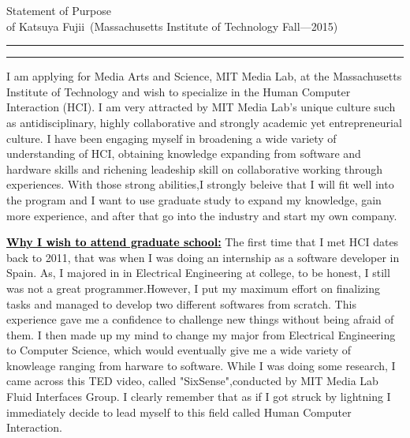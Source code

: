 \documentclass{article}
\newcommand{\soptitle}{Statement of Purpose}
\newcommand{\yourname}{Katsuya Fujii}
\newcommand{\statement}[1]{\par\medskip
  \underline{\textcolor{black}{\textbf{#1:}}}\space
}
\begin{document}
\begin{center}\LARGE\soptitle\\
\large of \yourname\ (Massachusetts Institute of Technology Fall---2015)
\end{center}

\hrule
\vspace{1pt}
\hrule height 1pt

\bigskip


I am applying for Media Arts and Science, MIT Media Lab, at the Massachusetts Institute of Technology and wish to specialize in the Human Computer Interaction (HCI). I am very attracted by MIT Media Lab's unique culture such as antidisciplinary, highly collaborative and strongly academic yet entrepreneurial culture. I have been engaging myself in broadening a wide variety of understanding of HCI, obtaining knowledge expanding from software and hardware skills and richening leadeship skill on collaborative working through experiences. With those strong abilities,I strongly beleive that I will fit well into the program and I want to use graduate study to expand my knowledge, gain more experience, and after that go into the industry and start my own company.


\statement{Why I wish to attend graduate school} The first time that I met HCI dates back to 2011, that was when I was doing an internship as a software developer in Spain. As, I majored in in Electrical Engineering at college, to be honest, I still was not a great programmer.However, I put my maximum effort on finalizing tasks and managed to develop two different softwares from scratch. This experience gave me a confidence to challenge new things without being afraid of them. I then made up my mind to change my major from Electrical Engineering to Computer Science, which would eventually give me a wide variety of knowleage ranging from harware to software.  While I was doing some research, I came across this TED video, called "SixSense",conducted by MIT Media Lab Fluid Interfaces Group. I clearly remember that as if I got struck by lightning I immediately decide to lead myself to this field called Human Computer Interaction. 
\end{document}
